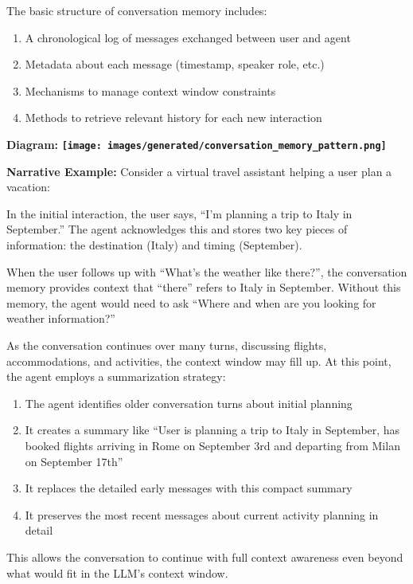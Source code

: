 \documentclass[11pt,oneside]{book}
\providecommand{\pandocbounded}[1]{\textbf{#1}}
\providecommand{\tightlist}{%
  \setlength{\itemsep}{0pt}\setlength{\parskip}{0pt}}
\begin{document}
The basic structure of conversation memory includes:

\begin{enumerate}
\def\labelenumi{\arabic{enumi}.}
\tightlist
\item
  A chronological log of messages exchanged between user and agent
\item
  Metadata about each message (timestamp, speaker role, etc.)
\item
  Mechanisms to manage context window constraints
\item
  Methods to retrieve relevant history for each new interaction
\end{enumerate}

\textbf{Diagram:}
\pandocbounded{\texttt{[image: images/generated/conversation\_memory\_pattern.png]}}

\textbf{Narrative Example:} Consider a virtual travel assistant helping
a user plan a vacation:

In the initial interaction, the user says, ``I'm planning a trip to
Italy in September.'' The agent acknowledges this and stores two key
pieces of information: the destination (Italy) and timing (September).

When the user follows up with ``What's the weather like there?'', the
conversation memory provides context that ``there'' refers to Italy in
September. Without this memory, the agent would need to ask ``Where and
when are you looking for weather information?''

As the conversation continues over many turns, discussing flights,
accommodations, and activities, the context window may fill up. At this
point, the agent employs a summarization strategy:

\begin{enumerate}
\def\labelenumi{\arabic{enumi}.}
\tightlist
\item
  The agent identifies older conversation turns about initial planning
\item
  It creates a summary like ``User is planning a trip to Italy in
  September, has booked flights arriving in Rome on September 3rd and
  departing from Milan on September 17th''
\item
  It replaces the detailed early messages with this compact summary
\item
  It preserves the most recent messages about current activity planning
  in detail
\end{enumerate}

This allows the conversation to continue with full context awareness
even beyond what would fit in the LLM's context window.
\end{document}

